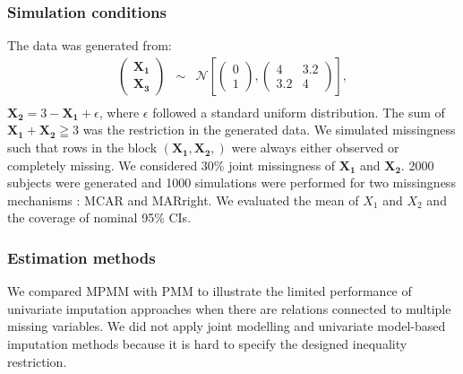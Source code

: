 	\subsubsection{Simulation conditions} 
	The data was generated from: 
	\begin{eqnarray*}
		\begin{pmatrix}\boldsymbol{X_{1}}\\
			\boldsymbol{X_{3}}
		\end{pmatrix} & \sim & \mathcal{N}\left[\left(\begin{array}{c}
			0\\
			1
		\end{array}\right),\left(\begin{array}{cc}
			4 & 3.2\\
			3.2 & 4
		\end{array}\right)\right],\\
	\end{eqnarray*}
	$\boldsymbol{X_2} = 3 - \boldsymbol{X_1} + \epsilon$, where $\epsilon$ followed a standard uniform distribution. The sum of $\boldsymbol{X_1} + \boldsymbol{X_2} \geqq 3$ was the restriction in the generated data. We simulated missingness such that rows in the block $(\boldsymbol{X_1, X_2,})$ were always either observed or completely missing. We considered 30\% joint missingness of $\boldsymbol{X_1}$ and $\boldsymbol{X_2}$. 2000 subjects were generated and 1000 simulations were performed for two missingness mechanisms : MCAR and MARright. We evaluated the mean of $X_1$ and $X_2$ and the coverage of nominal 95\% CIs. 
	
	\subsubsection{Estimation methods}
	We compared MPMM with PMM to illustrate the limited performance of univariate imputation approaches when there are relations connected to multiple missing variables. We did not apply joint modelling and univariate model-based imputation methods because it is hard to specify the designed inequality restriction.
	
